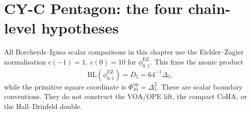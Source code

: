 \chapter{CY-C Pentagon: the four chain-level hypotheses}
\label{ch:cy-c-pentagon-hypothesis-closures}

\providecommand{\CoHA}{\mathrm{CoHA}}
\providecommand{\Coh}{\mathrm{Coh}}
\providecommand{\HH}{\mathrm{HH}}
\providecommand{\Sym}{\mathrm{Sym}}
\providecommand{\Hilb}{\mathrm{Hilb}}
\providecommand{\Eone}{E_{1}}
\providecommand{\gbkm}{\mathfrak{g}_{\Delta_5}}
\providecommand{\kch}{\kappa_{\mathrm{ch}}}
\providecommand{\kcat}{\kappa_{\mathrm{cat}}}
\providecommand{\kbkm}{\kappa_{\mathrm{BKM}}}
\providecommand{\rhoR}{\rho}
\providecommand{\LMuk}{\Lambda_{\mathrm{Muk}}}
\providecommand{\Fcl}{\mathcal{F}_{\mathrm{cl}}}
\providecommand{\Fq}{\mathcal{F}_{q}}

All Borcherds--Igusa scalar comparisons in this chapter use the
Eichler--Zagier normalisation \(c(-1)=1,\ c(0)=10\) for
\(\phi_{0,1}^{\mathrm{EZ}}\). This fixes the monic product
\[
 \mathrm{BL}(\phi_{0,1}^{\mathrm{EZ}})=D_5=64^{-1}\Delta_5,
\]
while the primitive square coordinate is
\(\Phi_{10}^{\mathrm{un}}=\Delta_5^2\).
These are scalar boundary conventions. They do not construct the
VOA/OPE lift, the compact CoHA, or the Hall--Drinfeld double.

